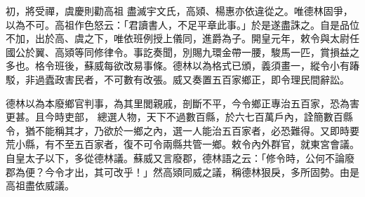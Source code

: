 \begin{pinyinscope}
 初，將受禪，虞慶則勸高祖
 盡滅宇文氏，高熲、楊惠亦依違從之。唯德林固爭，以為不可。高祖作色怒云：「君讀書人，不足平章此事。」於是遂盡誅之。自是品位不加，出於高、虞之下，唯依班例授上儀同，進爵為子。開皇元年，敕令與太尉任國公於翼、高熲等同修律令。事訖奏聞，別賜九環金帶一腰，駿馬一匹，賞損益之多也。格令班後，蘇威每欲改易事條。德林以為格式已頒，義須畫一，縱令小有踳駁，非過蠹政害民者，不可數有改張。威又奏置五百家鄉正，即令理民間辭訟。



 德林以為本廢鄉官判事，為其里閭親戚，剖斷不平，今令鄉正專治五百家，恐為害更甚。且今時吏部，
 總選人物，天下不過數百縣，於六七百萬戶內，詮簡數百縣令，猶不能稱其才，乃欲於一鄉之內，選一人能治五百家者，必恐難得。又即時要荒小縣，有不至五百家者，復不可令兩縣共管一鄉。敕令內外群官，就東宮會議。自皇太子以下，多從德林議。蘇威又言廢郡，德林語之云：「修令時，公何不論廢郡為便？今令才出，其可改乎！」然高熲同威之議，稱德林狠戾，多所固勢。由是高祖盡依威議。




\end{pinyinscope}
